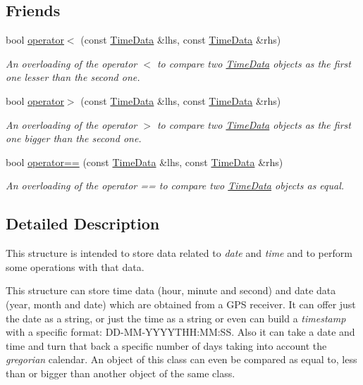 \subsection*{Friends}
\begin{DoxyCompactItemize}
\item 
bool \hyperlink{structTimeData_a05ed1f021fd859fd0507d8ec74de5afd}{operator$<$} (const \hyperlink{structTimeData}{Time\+Data} \&lhs, const \hyperlink{structTimeData}{Time\+Data} \&rhs)
\begin{DoxyCompactList}\small\item\em An overloading of the operator $<$ to compare two \hyperlink{structTimeData}{Time\+Data} objects as the first one lesser than the second one. \end{DoxyCompactList}\item 
bool \hyperlink{structTimeData_a6ba5c50a9564dae90072889e68cc8a42}{operator$>$} (const \hyperlink{structTimeData}{Time\+Data} \&lhs, const \hyperlink{structTimeData}{Time\+Data} \&rhs)
\begin{DoxyCompactList}\small\item\em An overloading of the operator $>$ to compare two \hyperlink{structTimeData}{Time\+Data} objects as the first one bigger than the second one. \end{DoxyCompactList}\item 
bool \hyperlink{structTimeData_a77e7e3db1d21909c98eb40309a3ac989}{operator==} (const \hyperlink{structTimeData}{Time\+Data} \&lhs, const \hyperlink{structTimeData}{Time\+Data} \&rhs)
\begin{DoxyCompactList}\small\item\em An overloading of the operator == to compare two \hyperlink{structTimeData}{Time\+Data} objects as equal. \end{DoxyCompactList}\end{DoxyCompactItemize}


\subsection{Detailed Description}
This structure is intended to store data related to {\itshape date} and {\itshape time} and to perform some operations with that data. 

This structure can store time data (hour, minute and second) and date data (year, month and date) which are obtained from a G\+PS receiver. It can offer just the date as a string, or just the time as a string or even can build a {\itshape timestamp} with a specific format\+: D\+D-\/\+M\+M-\/\+Y\+Y\+Y\+Y\+T\+HH\+:MM\+:SS. Also it can take a date and time and turn that back a specific number of days taking into account the {\itshape gregorian} calendar. An object of this class can even be compared as equal to, less than or bigger than another object of the same class. 

